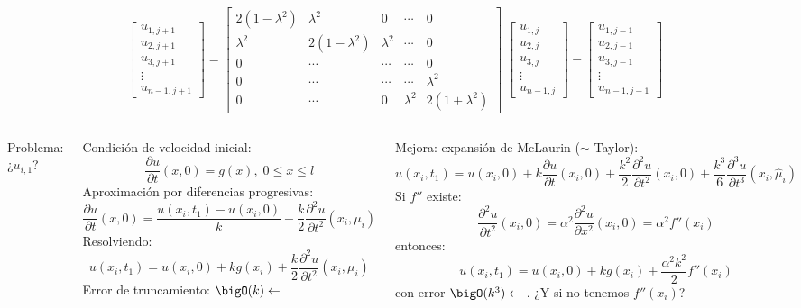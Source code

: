 \documentclass[9pt, aspectratio=169]{beamer}
\begin{document}
\begin{frame}
\[
    \begin{bmatrix} u_{1,j+1} \\ u_{2,j+1} \\ u_{3,j+1} \\ \vdots \\ u_{n-1,j+1} \end{bmatrix}
    =
    \begin{bmatrix}
    2(1-\lambda^2) & \lambda^2 & 0 & \cdots &  0 \\
    \lambda^2 & 2(1-\lambda^2) & \lambda^2 & \cdots & 0 \\
    0 & \cdots & \cdots & \cdots &  0 \\
    0 & \cdots & \cdots & \cdots &  \lambda^2 \\
    0 & \cdots & 0 & \lambda^2 & 2(1+\lambda^2) \end{bmatrix} \;
    \begin{bmatrix} u_{1,j} \\ u_{2,j} \\ u_{3,j} \\ \vdots \\ u_{n-1,j} \end{bmatrix}
    -
    \begin{bmatrix} u_{1,j-1} \\ u_{2,j-1} \\ u_{3,j-1} \\ \vdots \\ u_{n-1,j-1} \end{bmatrix}
\] \pause
\begin{columns}[t]
\alert{Problema:} ¿$u_{i, 1}$? 

Condición de velocidad inicial:
\[ \frac{\partial u}{\partial t}(x, 0) = g(x), \; 0 \leq x \leq l \]
Aproximación por diferencias progresivas:
\[ \frac{\partial u}{\partial t}(x, 0) = \frac{u(x_i, t_1) - u(x_i, 0)}{k} - \frac{k}{2} \frac{\partial^2 u}{\partial t^2}(x_i, \mu_i) \]
Resolviendo:
\[ u(x_i, t_1) = u(x_i, 0) + k g(x_i) +  \frac{k}{2} \frac{\partial^2 u}{\partial t^2}(x_i, \mu_i) \]
Error de truncamiento: $\bigO(k) \leftarrow$ \faThumbsODown
\pause

Mejora: expansión de McLaurin ($\sim$ Taylor):
\[ u(x_i, t_1) = u(x_i, 0) + k \frac{\partial u}{\partial t}(x_i,0) + \frac{k^2}{2} \frac{\partial^2 u}{\partial t^2}(x_i, 0) + \frac{k^3}{6} \frac{\partial^3 u}{\partial t^3}(x_i, \hat{\mu}_i) \]
Si $f''$ existe:
\[ \frac{\partial^2 u}{\partial t^2}(x_i, 0) = \alpha^2 \frac{\partial^2 u}{\partial x^2}(x_i, 0) = \alpha^2 f''(x_i) \]
entonces:
\[ u(x_i, t_1) = u(x_i, 0) + k g(x_i) + \frac{\alpha^2 k^2}{2} f''(x_i) \]
con error $\bigO(k^3) \leftarrow$ \faThumbsOUp. \pause \alert{¿Y si no tenemos $f''(x_i)$?}
\end{columns}
\end{frame}
\end{document}
